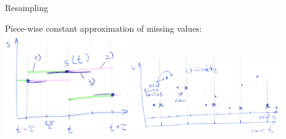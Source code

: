 \documentclass{beamer}
\begin{document}
\begin{frame}{Resampling}


Piece-wise constant approximation of missing values:
\includegraphics[width=0.4\textwidth]{resample1.png}\includegraphics[width=0.5\textwidth]{resample2.png}


\end{frame}
\end{document}
